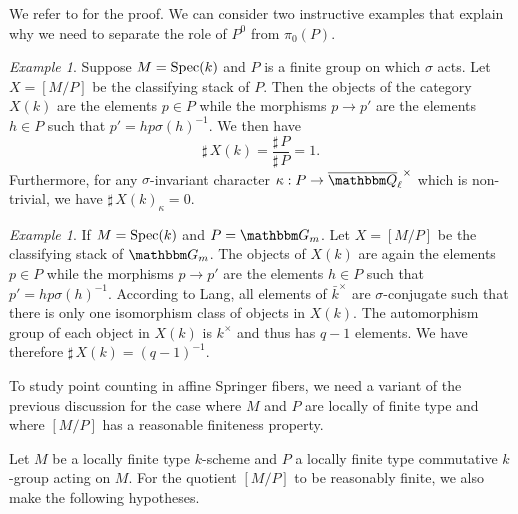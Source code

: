 \documentclass[12pt,english]{smfart}
\numberwithin{equation}{subsection}
\theoremstyle{remark}
\newtheorem{exemple}[equation]{Example}
\newcommand\GG{{\mathbbm G}}
\newcommand\QQ{{\mathbbm Q}}
\newcommand\Spec{{\rm Spec}}
\newcommand\Ql{{\overline\QQ_\ell}}
\begin{document}


We refer to \cite[A.3.1]{LN} for the proof. We can
consider two instructive examples that explain why we need to
separate the role of $P^0$ from $\pi_0(P)$.

\begin{exemple}\label{exemple : classifiant fini}
Suppose $M=\Spec(k)$ and $P$ is a finite group on which
$\sigma$ acts. Let $X=[M/ P]$ be the classifying stack of $P$. Then the objects of the
category $X(k)$ are the elements $p\in P$ while the morphisms
$p\rightarrow p'$ are the elements $h\in P$ such that
$p'=hp\sigma(h)^{-1}$. We then have
$${\sharp\,} X(k)=\frac{{\sharp\,} P} {{\sharp\,} P}=1.$$
Furthermore, for any $\sigma$-invariant character $\kappa:
P\rightarrow \Ql^\times$ which is non-trivial, we have ${\sharp\,} X(k)_\kappa=0$.
\end{exemple}

\begin{exemple}\label{exemple : classifiant G_m}
If $M=\Spec(k)$ and $P=\GG_m$. Let $X=[M/ P]$ be the classifying stack of $\GG_m$.
The objects of $X(k)$ are again the elements $p\in P$ while the
morphisms $p\rightarrow p'$ are the elements $h\in P$ such that
$p'=hp\sigma(h)^{-1}$. According to Lang, all elements of $\bar
k^\times$ are $\sigma$-conjugate such that there is only one
isomorphism class of objects in $X(k)$. The automorphism group of
each object in $X(k)$ is $k^\times$ and thus has $q-1$ elements. We have
therefore ${\sharp\,} X(k)=(q-1)^{-1}$.
\end{exemple}

To study point counting in affine Springer fibers,
we need a variant of the previous discussion for the case where
$M$ and $P$ are locally of finite type and where $[M/ P]$ has a
reasonable finiteness property.

Let $M$ be a locally finite type $k$-scheme and $P$ a locally finite type
commutative $k$-group acting on $M$. For the quotient
$[M/ P]$ to be reasonably finite, we also make the following hypotheses.
\end{document}
